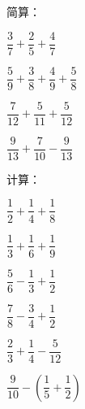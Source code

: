 \documentclass[a4paper,12pt]{ctexart}
\begin{document}
\begin{exercise}
\item 简算：
  \begin{subexercise}
    \item $\dfrac{3}{7}+\dfrac{2}{5}+\dfrac{4}{7}$
    \item $\dfrac{5}{9}+\dfrac{3}{8}+\dfrac{4}{9}+\dfrac{5}{8}$
    \item $\dfrac{7}{12}+\dfrac{5}{11}+\dfrac{5}{12}$
    \item $\dfrac{9}{13}+\dfrac{7}{10}-\dfrac{9}{13}$
  \end{subexercise}

\item 计算：
  \begin{subexercise}
    \item $\dfrac{1}{2}+\dfrac{1}{4}+\dfrac{1}{8}$
    \item $\dfrac{1}{3}+\dfrac{1}{6}+\dfrac{1}{9}$
    \item $\dfrac{5}{6}-\dfrac{1}{3}+\dfrac{1}{2}$
    \item $\dfrac{7}{8}-\dfrac{3}{4}+\dfrac{1}{2}$
    \item $\dfrac{2}{3}+\dfrac{1}{4}-\dfrac{5}{12}$
    \item $\dfrac{9}{10}-\left(\dfrac{1}{5}+\dfrac{1}{2}\right)$
  \end{subexercise}
\end{exercise}

\newpage



\bigskip
\end{document}
